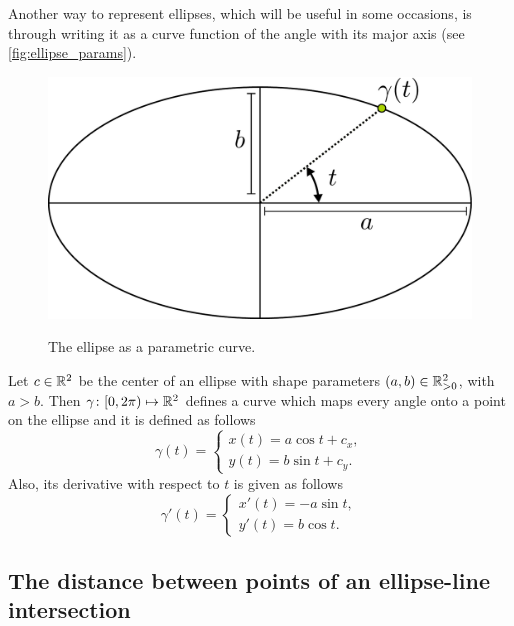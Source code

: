 Another way to represent ellipses, which will be useful in some occasions, is through writing it as a curve function of the angle with its major axis (see \autoref{fig:ellipse_params}).

\begin{figure}[H]
    \centering
    
    \caption{The ellipse as a parametric curve.}
%    
   	\includegraphics[scale=.36]{tex/figures/ellipse_definition.pdf}
    \fautor
    \label{fig:ellipse_params}
\end{figure}

Let $c \in \mathbb{R}^2$ be the center of an ellipse with shape parameters $(a,b) \in \mathbb{R}^2_{>0}$, with $a>b$. Then $\gamma\colon[0, 2\pi)\mapsto\mathbb{R}^2$ defines a curve which maps every angle onto a point on the ellipse and it is defined as follows
\begin{equation}\label{eq:parametric_ellipse}
\gamma(t) = \left\{
\begin{array}{l}
x(t)= a\cos{t} + c_x,\\
y(t)=b\sin{t} + c_y.
\end{array}
\right.
\end{equation}
Also, its derivative with respect to $t$ is given as follows
\begin{equation}\label{eq:der_parametric_ellipse}
\gamma'(t) = \left\{
\begin{array}{l}
x'(t)= -a\sin{t},\\
y'(t)=b\cos{t}.
\end{array}
\right.
\end{equation}

\subsection{The distance between points of an ellipse-line intersection}

